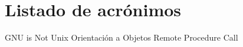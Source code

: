 \chapter{Listado de acrónimos}

{\small
\begin{acronym}[XXXXXXXX]
       {\acs{GNU} is Not Unix}
        {Orientación a Objetos}
       {Remote Procedure Call}
\end{acronym}
}




